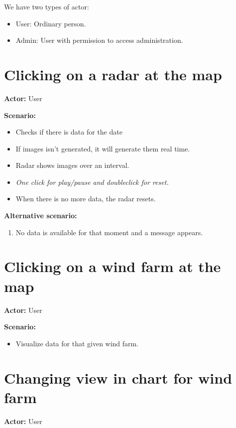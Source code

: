 We have two types of actor:
\begin{itemize}
\item User: Ordinary person.
\item Admin: User with permission to access administration.
\end{itemize}

\section{Clicking on a radar at the map}
\textbf{Actor:} User

\textbf{Scenario:}
\begin{itemize}
\item Checks if there is data for the date
\item If images isn't generated, it will generate them real time.
\item Radar shows images over an interval.
\item \emph{One click for play/pause and doubleclick for reset.}
\item When there is no more data, the radar resets.
\end{itemize}
\textbf{Alternative scenario:} 
\begin{enumerate}
\item No data is available for that moment and a message appears.
\end{enumerate}

\section{Clicking on a wind farm at the map}
\textbf{Actor:} User

\textbf{Scenario:}
\begin{itemize}
\item Visualize data for that given wind farm.
\end{itemize}

\section{Changing view in chart for wind farm}
\textbf{Actor:} User

